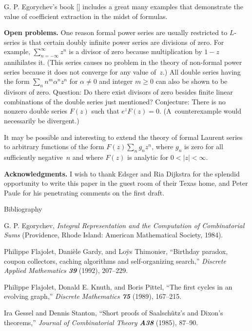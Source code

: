 G. P. Egorychev's book [\EGO] includes a great many examples that demonstrate
the value of coefficient extraction in the midst of formulas.

\bigskip\noindent
{\bf Open problems.}\quad
One reason formal power series are usually restricted to $L$-series is
that certain doubly infinite power series are divisions of zero. For
example, $\sum_{n=-\infty}^{\infty}z^n$ is a divisor of zero because
multiplication by $1-z$ annihilates it. (This series causes no problem
in the theory of non-formal power series because it does not converge
for any value of~$z$.) All double series having the form
$\sum_nn^m\alpha^nz^n$ for $\alpha\neq 0$ and integer $m\geq 0$ can
also be shown to be divisors of zero.   Question: Do there exist
divisors of zero besides finite linear combinations of the double
series just mentioned? Conjecture: There is no nonzero double series
$F(z)$ such that $e^zF(z)=0$. (A~counterexample would necessarily be
divergent.) 

It may be possible and interesting to extend the theory of formal
Laurent series to arbitrary functions of the form $F(z)\sum_ng_nz^n$,
where $g_n$ is zero for all sufficiently negative~$n$ and where $F(z)$
is analytic for $0<\vert z\vert <\infty$. 

\bigskip\noindent
{\bf Acknowledgments.}\quad
I wish to thank Edsger and Ria Dijkstra for the splendid opportunity to
write this paper in the guest room of their Texas home, and Peter Paule
for his penetrating comments on the first draft.

\vfill\eject

\bigskip
\centerline{Bibliography}

\medskip\bib
[\EGO]\quad
G. P. Egorychev, {\sl Integral Representation and the Computation of
Combinatorial Sums\/} (Providence, Rhode Island: American Mathematical
Society, 1984).

\medskip\bib
[\FGT]\quad
Philippe Flajolet, Dani\`ele Gardy, and Lo\"ys Thimonier, ``Birthday
paradox, coupon collectors, caching algorithms and self-organizing
search,'' {\sl Discrete Applied Mathematics\/ \bf 39} (1992), 207--229.

\medskip\bib
[\FKP]\quad
Philippe Flajolet, Donald E. Knuth, and Boris Pittel, ``The first
cycles in an evolving graph,'' {\sl Discrete Mathematics\/ \bf 75}
(1989), 167--215.

\medskip\bib
[\GS]\quad
Ira Gessel and Dennis Stanton, ``Short proofs of Saalsch\"utz's and
Dixon's theorems,'' {\sl Journal of Combinatorial Theory\/ \bf A38}
(1985), 87--90.

